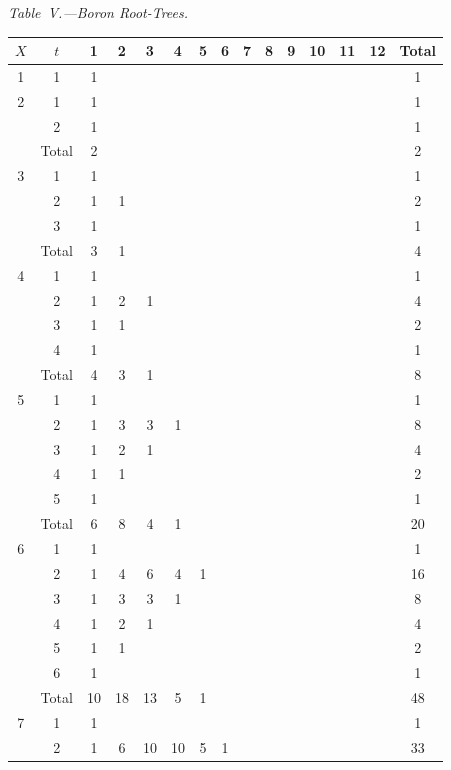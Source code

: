 \documentclass[11pt,a4paper]{book}
\begin{document}
{\textit{Table~V.---Boron Root-Trees.}
\begin{center}
\small
\begin{longtable}{|c|c|c|c|c|c|c|c|c|c|c|c|c|c|c|}
\hline
$X$ & $t$ & 1 & 2 & 3 & 4 & 5 & 6 & 7 & 8 & 9 & 10 & 11 & 12 & Total \\
\hline
\endfirsthead
1 & 1 & 1 & & & & & & & & & & & & 1 \\
\hline
2 & 1 & 1 & & & & & & & & & & & & 1 \\
  & 2 & 1 & & & & & & & & & & & & 1 \\
  & Total & 2 & & & & & & & & & & & & 2 \\
\hline
3 & 1 & 1 & & & & & & & & & & & & 1 \\
  & 2 & 1 & 1 & & & & & & & & & & & 2 \\
  & 3 & 1 & & & & & & & & & & & & 1 \\
  & Total & 3 & 1 & & & & & & & & & & & 4 \\
\hline
4 & 1 & 1 & & & & & & & & & & & & 1 \\
  & 2 & 1 & 2 & 1 & & & & & & & & & & 4 \\
  & 3 & 1 & 1 & & & & & & & & & & & 2 \\
  & 4 & 1 & & & & & & & & & & & & 1 \\
  & Total & 4 & 3 & 1 & & & & & & & & & & 8 \\
\hline
5 & 1 & 1 & & & & & & & & & & & & 1 \\
  & 2 & 1 & 3 & 3 & 1 & & & & & & & & & 8 \\
  & 3 & 1 & 2 & 1 & & & & & & & & & & 4 \\
  & 4 & 1 & 1 & & & & & & & & & & & 2 \\
  & 5 & 1 & & & & & & & & & & & & 1 \\
  & Total & 6 & 8 & 4 & 1 & & & & & & & & & 20 \\
\hline
6 & 1 & 1 & & & & & & & & & & & & 1 \\
  & 2 & 1 & 4 & 6 & 4 & 1 & & & & & & & & 16 \\
  & 3 & 1 & 3 & 3 & 1 & & & & & & & & & 8 \\
  & 4 & 1 & 2 & 1 & & & & & & & & & & 4 \\
  & 5 & 1 & 1 & & & & & & & & & & & 2 \\
  & 6 & 1 & & & & & & & & & & & & 1 \\
  & Total & 10 & 18 & 13 & 5 & 1 & & & & & & & & 48 \\
\hline
7 & 1 & 1 & & & & & & & & & & & & 1 \\
  & 2 & 1 & 6 & 10 & 10 & 5 & 1 & & & & & & & 33 \\

\end{longtable}
\end{center}}
\end{document}
